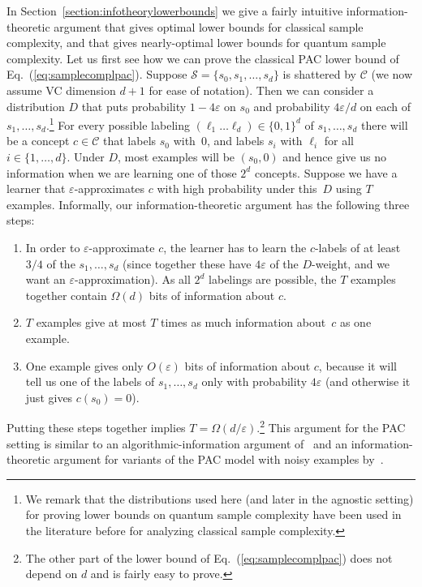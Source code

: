 \documentclass[twoside,11pt]{article}
\newcommand{\eps}{\varepsilon}
\newcommand{\Sh}{\ensuremath{\mathcal{S}}}
\def\01{\{0,1\}}
\newcommand{\C}{\ensuremath{\mathscr{C}}}
\begin{document}
In Section~\ref{section:infotheorylowerbounds} we give a fairly intuitive information-theoretic argument that gives optimal lower bounds for classical sample complexity, and that gives nearly-optimal lower bounds for quantum sample complexity. Let us first see how we can prove the classical PAC lower bound of Eq.~(\ref{eq:samplecomplpac}). Suppose $\Sh=\{s_0,s_1,\ldots,s_d\}$ is shattered by $\C$ (we now assume VC dimension $d+1$ for ease of notation). Then we can consider a distribution $D$ that puts probability $1-4\eps$ on $s_0$ and probability $4\eps/d$ on each of $s_1,\ldots,s_d$.\footnote{We remark that the distributions used here (and later in the agnostic setting) for proving lower bounds on quantum sample complexity have been used in the literature before for analyzing classical sample complexity.} For every possible labeling $(\ell_1 \ldots \ell_d)\in\01^d$ of $s_1,\ldots,s_d$ there will be a concept $c\in\C$ that labels $s_0$ with~0, and labels $s_i$ with $\ell_i$ for all $i\in\{1,\ldots,d\}$. Under $D$, most examples will be $(s_0,0)$ and hence give us no information when we are learning one of those $2^d$ concepts. Suppose we have a learner that $\eps$-approximates $c$ with high probability under this~$D$ using $T$ examples. Informally, our information-theoretic argument has the following three steps:
\begin{enumerate}
	\item In order to $\eps$-approximate $c$, the learner has to learn the $c$-labels of at least $3/4$ of the $s_1,\ldots,s_d$ (since together these have $4\eps$ of the $D$-weight, and we want an $\eps$-approximation). As all $2^d$ labelings are possible, the $T$ examples together contain $\Omega(d)$ bits of information about $c$.
	\item $T$ examples give at most $T$ times as much information about~$c$ as one example.
	\item One example gives only $O(\eps)$ bits of information about $c$, because it will tell us one of the labels of $s_1,\ldots,s_d$ only with probability $4\eps$ (and otherwise it just gives $c(s_0)=0$).
\end{enumerate}
Putting these steps together implies $T=\Omega(d/\eps)$.\footnote{The other part of the lower bound of Eq.~(\ref{eq:samplecomplpac}) does not depend on $d$ and is fairly easy to prove.} 
This argument for the PAC setting is similar to an algorithmic-information argument of~\cite{apolloni&gentile:act} and an information-theoretic argument for variants of the PAC model with noisy examples by~\cite{gentile&helmbold:it}. 
\end{document}
